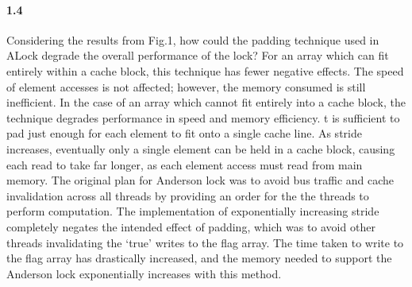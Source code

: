 \documentclass[12pt,letterpaper,titlepage]{article}
\begin{document}
    \paragraph{1.4}
    Considering the results from Fig.1, how could the padding technique used in ALock degrade the overall performance of the lock? 
    For an array which can fit entirely within a cache block, this technique has fewer negative effects. The speed of element accesses is not affected; however, the memory consumed is still inefficient. In the case of an array which cannot fit entirely into a cache block, the technique degrades performance in speed and memory efficiency. t is sufficient to pad just enough for each element to fit onto a single cache line. As stride increases, eventually only a single element can be held in a cache block, causing each read to take far longer, as each element access must read from main memory.
    The original plan for Anderson lock was to avoid bus traffic and cache invalidation across all threads by providing an order for the  the threads to perform computation. The implementation of exponentially increasing stride completely negates the intended effect of padding, which was to avoid other threads invalidating the ‘true’ writes to the flag array. The time taken to write to the flag array has drastically increased, and the memory needed to support the Anderson lock exponentially increases with this method.
  
\end{document}
